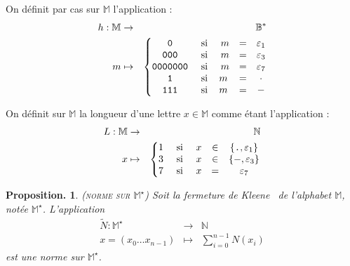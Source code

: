 \documentclass[twocolumn,pre,floats,aps,amsmath,amssymb]{revtex4}
\newtheorem{proposition}[theorem]{Proposition.}
\newenvironment{definition}[1][D\'efinition.]{\begin{trivlist}
\item[\hskip \labelsep {\bfseries #1}]}{\end{trivlist}}
\begin{document}
\begin{definition}
  On d\'efinit par cas sur $\mathbb{M}$ l'application :
  \begin{eqnarray*}
    h : \mathbb{M} &\rightarrow& \mathbb{B^{*}}\\
                 m &\mapsto&
                 \left\{\begin{matrix}
                        \texttt{0} \ &\textup{si}& \ m &=& \varepsilon_1 \\ 
                        \texttt{000} \ &\textup{si}& \ m &=& \varepsilon_3 \\
                        \texttt{0000000} \ &\textup{si}& \ m &=& \varepsilon_7 \\
                        \texttt{1} \ &\textup{si}& m &=& \cdot\\
                        \texttt{111} \ &\textup{si}& m &=& -
                        \end{matrix}\right.
  \end{eqnarray*}
\end{definition}

\begin{definition}
On d\'efinit sur $\mathbb{M}$ la longueur d'une lettre $x \in \mathbb{M}$ comme \'etant l'application :
\begin{eqnarray*}
  L : \mathbb{M} &\rightarrow& \mathbb{N}\\
              x  &\mapsto&
                 \left\{\begin{matrix}
                 1 \ &\textup{si }& x &\in& \left \{ \texttt{.}, \varepsilon_1 \right \} \\
                 3 \ &\textup{si }& x &\in& \left \{ -, \varepsilon_3 \right \} \\ 
                 7 \ &\textup{si }& x &=& \varepsilon_7
              \end{matrix}\right.
\end{eqnarray*}
\end{definition}

\begin{proposition}
  {(\textsc{norme sur $\mathbb{M}^{\star}$})}
  Soit la fermeture de Kleene~\cite{kleene_star} de l'alphabet $\mathbb{M}$, not\'ee $\mathbb{M}^{\star}$. L'application
  \begin{eqnarray*}
    \widetilde{N} : \mathbb{M}^{\star} &\rightarrow& \mathbb{N}\\
    x = (x_0 \dots x_{n - 1}) &\mapsto& \sum_{i = 0}^{n - 1}{N(x_i)}
  \end{eqnarray*}
  est une norme sur $\mathbb{M}^{\star}$.
\end{proposition}
\end{document}
